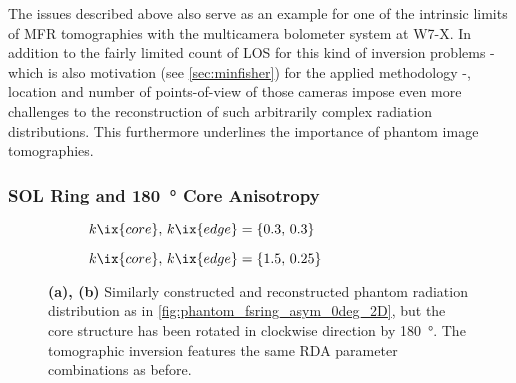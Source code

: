                 The issues described above also serve as an example for one of the intrinsic limits of MFR tomographies with the multicamera bolometer system at W7-X. In addition to the fairly limited count of LOS for this kind of inversion problems - which is also motivation (see \cref{sec:minfisher}) for the applied methodology -, location and number of points-of-view of those cameras impose even more challenges to the reconstruction of such arbitrarily complex radiation distributions. This furthermore underlines the importance of phantom image tomographies.%
%
            \subsubsection*{SOL Ring and \SI{180}{\degree} Core Anisotropy}%
%
                \begin{figure}[t]%
                    \centering%
                    \begin{subfigure}{\textwidth}%
                        \centering%
                        \caption{$k\ix{core},\,k\ix{edge}=\left\{0.3,\,0.3\right\}$}%
                    \end{subfigure}%
                    \newline%
                    \begin{subfigure}{\textwidth}%
                        \centering%
                        \caption{$k\ix{core},\,k\ix{edge}=\left\{1.5,\,0.25\right\}$}%
                    \end{subfigure}%
                    \caption{\textbf{(a), (b)} Similarly constructed and reconstructed phantom radiation distribution as in \cref{fig:phantom_fsring_asym_0deg_2D}, but the core structure has been rotated in clockwise direction by \SI{180}{\degree}. The tomographic inversion features the same RDA parameter combinations as before.}\label{fig:phantom_fsring_asym_180deg_2D}%
                \end{figure}%
%
